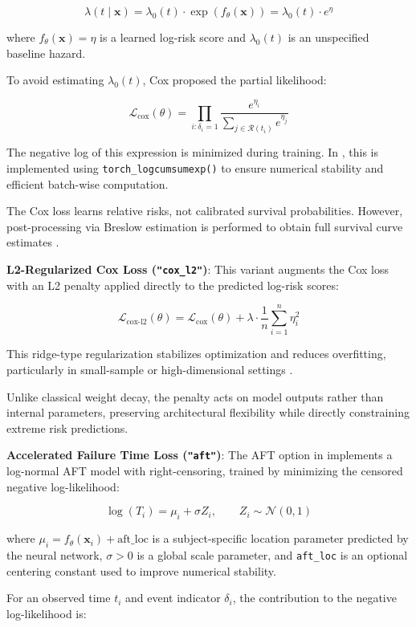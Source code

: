 \[
\lambda(t \mid \mathbf{x}) = \lambda_0(t) \cdot \exp(f_\theta(\mathbf{x})) = \lambda_0(t) \cdot e^\eta
\]

where \(f_\theta(\mathbf{x}) = \eta\) is a learned log-risk score and \(\lambda_0(t)\) is an unspecified baseline hazard.

To avoid estimating \(\lambda_0(t)\), Cox proposed the partial likelihood:

\[
\mathcal{L}_{\text{cox}}(\theta) = \prod_{i:\delta_i = 1} \frac{e^{\eta_i}}{\sum_{j \in \mathcal{R}(t_i)} e^{\eta_j}}
\]

The negative log of this expression is minimized during training. In , this is implemented using \texttt{torch\_logcumsumexp()} to ensure numerical stability and efficient batch-wise computation.

The Cox loss learns relative risks, not calibrated survival probabilities. However, post-processing via Breslow estimation is performed to obtain full survival curve estimates \citep{breslow1972contribution}.

\textbf{L2-Regularized Cox Loss (\texttt{"cox\_l2"})}: This variant augments the Cox loss with an L2 penalty applied directly to the predicted log-risk scores:

\[
\mathcal{L}_{\text{cox-l2}}(\theta)
=
\mathcal{L}_{\text{cox}}(\theta)
+
\lambda \cdot \frac{1}{n} \sum_{i=1}^n \eta_i^2
\]

This ridge-type regularization stabilizes optimization and reduces overfitting, particularly in small-sample or high-dimensional settings \citep{friedman2010regularization}.

Unlike classical weight decay, the penalty acts on model outputs rather than internal parameters, preserving architectural flexibility while directly constraining extreme risk predictions.

\textbf{Accelerated Failure Time Loss (\texttt{"aft"})}: The AFT option in  implements a log-normal AFT model with right-censoring, trained by minimizing the censored negative log-likelihood:

\[
\log(T_i) = \mu_i + \sigma Z_i,\qquad Z_i \sim \mathcal{N}(0,1)
\]

where \(\mu_i = f_\theta(\mathbf{x}_i) + \mathrm{aft\_loc}\) is a subject-specific location parameter predicted by the neural network, \(\sigma > 0\) is a global scale parameter, and \texttt{aft\_loc} is an optional centering constant used to improve numerical stability.

For an observed time \(t_i\) and event indicator \(\delta_i\), the contribution to the negative log-likelihood is:

